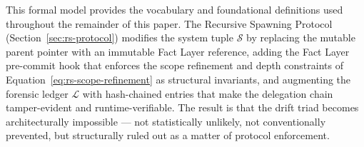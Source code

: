 This formal model provides the vocabulary and foundational definitions used throughout the remainder of this paper. The Recursive Spawning Protocol (Section~\ref{sec:rs-protocol}) modifies the system tuple $\mathcal{S}$ by replacing the mutable parent pointer with an immutable Fact Layer reference, adding the Fact Layer pre-commit hook that enforces the scope refinement and depth constraints of Equation~\ref{eq:rs-scope-refinement} as structural invariants, and augmenting the forensic ledger $\mathcal{L}$ with hash-chained entries that make the delegation chain tamper-evident and runtime-verifiable. The result is that the drift triad becomes architecturally impossible — not statistically unlikely, not conventionally prevented, but structurally ruled out as a matter of protocol enforcement.
